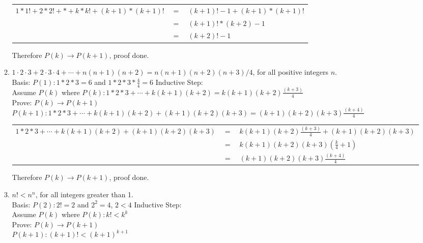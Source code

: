 \begin{enumerate}
\begin{enumerate}
\begin{table}[h]
\centering
\begin{tabular}{rcl}
$1 * 1! + 2 * 2! + * + k * k! + (k+1) * (k+1)!$ & $=$ & $(k+1)! - 1 + (k+1) * (k+1)!$ \\
                                                & $=$ & $(k+1)! * (k+2)-1$            \\
                                                & $=$ & $(k+2)! -1$                  
\end{tabular}
\end{table}


Therefore $P(k) \rightarrow P(k+1)$, proof done.\\

\item $1 \cdot 2 \cdot 3 + 2 \cdot 3 \cdot 4 + \cdots + n(n+1)(n+2) = n(n+1)(n+2)(n+3)/4$, for all positive integers $n$.\\

Basis: $P(1):  1*2*3 = 6$ and $1*2*3* \frac{4}{4} = 6$
Inductive Step:\\
Assume $P(k)$ where $P(k): 1 * 2 * 3 + \cdots + k(k+1)(k+2) = k(k+1)(k+2) \frac{(k+3)}{4}$\\
Prove: $P(k) \rightarrow P(k+1)$\\
$P(k+1): 1 * 2 * 3 + \cdots + k(k+1)(k+2) + (k+1)(k+2)(k+3) = (k+1)(k+2)(k+3) \frac{(k+4)}{4}$\\

\begin{table}[h]
\centering
\begin{tabular}{rcl}
$1 * 2 * 3 + \cdots + k(k+1)(k+2) + (k+1)(k+2)(k+3)$ & $=$ & $k(k+1)(k+2)\frac{(k+3)}{4} + (k+1)(k+2)(k+3)$ \\
                                                     & $=$ & $k(k+1)(k+2)(k+3)(\frac{k}{4} + 1)$            \\
                                                     & $=$ & $(k+1)(k+2)(k+3)\frac{(k+4)}{4}$              
\end{tabular}
\end{table}


Therefore $P(k) \rightarrow P(k+1)$, proof done.\\


\item $n! < n^n$, for all integers greater than 1.\\

Basis: $P(2):  2! = 2$ and $2^2 = 4$, $2<4$
Inductive Step:\\
Assume $P(k)$ where $P(k): k! < k^k$\\
Prove: $P(k) \rightarrow P(k+1)$\\
$P(k+1): (k+1)! < (k+1)^{k+1}$\\


\end{enumerate}
\end{enumerate}
